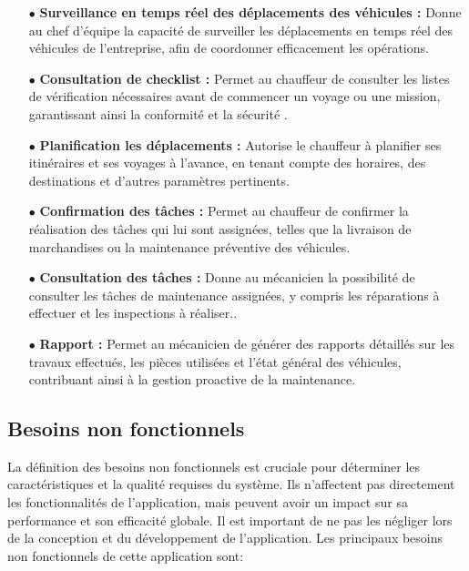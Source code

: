 \begin{itemize}
  \item[$\bullet$] \textbf {Surveillance en temps réel des déplacements des véhicules :} Donne au chef d'équipe la capacité de surveiller les déplacements en temps réel des véhicules de l'entreprise, afin de coordonner efficacement les opérations.\\

  \item[$\bullet$] \textbf {Consultation de checklist :} Permet au chauffeur de consulter les listes de vérification nécessaires avant de commencer un voyage ou une mission, garantissant ainsi la conformité et la sécurité .\\

  \item[$\bullet$] \textbf {Planification les déplacements :} Autorise le chauffeur à planifier ses itinéraires et ses voyages à l'avance, en tenant compte des horaires, des destinations et d'autres paramètres pertinents. \\

  \item[$\bullet$] \textbf {Confirmation des tâches :} Permet au chauffeur de confirmer la réalisation des tâches qui lui sont assignées, telles que la livraison de marchandises ou la maintenance préventive des véhicules.\\

  \item[$\bullet$] \textbf {Consultation des tâches :} Donne au mécanicien la possibilité de consulter les tâches de maintenance assignées, y compris les réparations à effectuer et les inspections à réaliser..\\

  \item[$\bullet$] \textbf {Rapport :}  Permet au mécanicien de générer des rapports détaillés sur les travaux effectués, les pièces utilisées et l'état général des véhicules, contribuant ainsi à la gestion proactive de la maintenance.\\


\end{itemize}




\subsection{Besoins non fonctionnels}
La définition des besoins non fonctionnels est cruciale pour déterminer les caractéristiques et la qualité requises du système. Ils n’affectent pas directement les fonctionnalités de l'application, mais peuvent avoir un impact sur sa performance et son efficacité globale. Il est important de ne pas les négliger lors de la conception et du développement de l'application. Les principaux besoins non fonctionnels de cette application sont:

